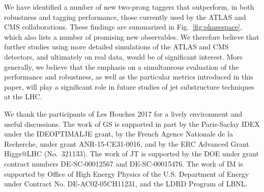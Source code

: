 \documentclass[11pt,letterpaper]{article}
\DeclareRobustCommand{\Fig}[1]{Fig.~\ref{#1}}
\begin{document}
We have identified a  number of new two-prong taggers that outperform, in both robustness and tagging performance, those currently used by the ATLAS and CMS collaborations. These findings are summarized in \Fig{fig:phasespace}, which also lists a number of promising new observables. We therefore believe that further studies using more detailed simulations of the ATLAS and CMS detectors, and ultimately on real data, would be of significant interest. More generally, we believe that the emphasis on a simultaneous evaluation of the performance and robustness, as well as the particular metrics introduced in this paper, will play a significant role in future studies of jet substructure techniques at the LHC.

\begin{acknowledgments}

We thank the participants of Les Houches 2017 for a lively environment and useful discussions. The work of GS is supported in part by the Paris-Saclay IDEX under the
IDEOPTIMALJE grant, by the French Agence Nationale de la Recherche,
under grant ANR-15-CE31-0016, and by the ERC Advanced Grant Higgs@LHC
(No.\ 321133).
%
The work of JT is supported by the DOE under grant contract numbers DE-SC-00012567 and DE-SC-00015476.
%
The work of IM is supported by Office of High Energy Physics of the U.S. Department of Energy under Contract No. DE-AC02-05CH11231, and the LDRD Program of LBNL.


\end{acknowledgments}




\end{document}
